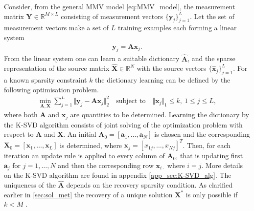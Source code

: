 Consider, from the general MMV model \eqref{eq:MMV_model}, the measurement matrix $\mathbf{Y} \in \mathbb{R}^{M \times L}$ consisting of measurement vectors $\lbrace \mathbf{y}_j \rbrace_{j=1}^L$. Let the set of measurement vectors make a set of $L$ training examples each forming a linear system
\begin{align*}
\mathbf{y}_j = \mathbf{A} \mathbf{x}_j.
\end{align*}
From the linear system one can learn a suitable dictionary $\hat{\mathbf{A}}$, and the sparse representation of the source matrix $\hat{\mathbf{X}} \in \mathbb{R}^N$ with the source vectors $\lbrace \hat{\mathbf{x}}_j \rbrace_{j=1}^L$.
For a known sparsity constraint $k$ the dictionary learning can be defined by the following optimisation problem. 
\begin{align}\label{eq:SVD1}
\min_{\mathbf{A}, \mathbf{X}} \sum_{j=1}^{L} \Vert \mathbf{y}_j - \mathbf{A} \mathbf{x}_j \Vert_2^2 \quad \text{subject to} \quad \Vert \mathbf{x}_j \Vert_1 \leq k, \ 1 \leq j \leq L,
\end{align}
where both $\mathbf{A}$ and $\mathbf{x}_j$ are quantities to be determined.
Learning the dictionary by the K-SVD algorithm consists of joint solving of the optimization problem with respect to $\mathbf{A}$ and $\mathbf{X}$. 
An initial $\mathbf{A}_0 = [\mathbf{a}_1, \dots, \mathbf{a}_N]$ is chosen and the corresponding $\mathbf{X}_0 = [\mathbf{x}_1, \dots, \mathbf{x}_L]$ is determined, where $\mathbf{x}_j = [x_{1j}, \dots, x_{Nj}]^T$. Then, for each iteration an update rule is applied to every column of $\mathbf{A}_0$, that is updating first $\mathbf{a}_j$ for $j = 1, \dots, N$ and then the corresponding row $\mathbf{x}_{i\cdot}$ where $i=j$. 
More details on the K-SVD algorithm are found in appendix \ref{app_sec:K-SVD_alg}. 
The uniqueness of the $\hat{\mathbf{A}}$ depends on the recovery sparsity condition. As clarified earlier in \ref{sec:sol_met} the recovery of a unique solution $\mathbf{X}^\ast$ is only possible if $k < M$ \cite{phd2015}.


